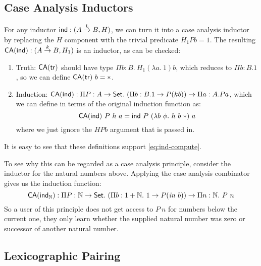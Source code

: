 \documentclass{article}
\newcommand{\Set}{\mathsf{Set}}
\newcommand{\inn}{\mathit{in}}
\begin{document}
\subsection{Case Analysis Inductors}

For any inductor $\mathsf{ind} : (A \stackrel{k}\to B, H)$, we can turn it
into a case analysis inductor by replacing the $H$ component with the
trivial predicate $H_1Pb = 1$. The resulting $\mathsf{CA}(\mathsf{ind}) : (A
\stackrel{k}\to B, H_1)$ is an inductor, as can be checked:
\begin{enumerate}
\item Truth: $\mathsf{CA}(\mathsf{tr})$ should have type $\Pi b : B.\ H_1(\lambda a.\
  1)b$, which reduces to $\Pi b : B. 1$, so we can define $\mathsf{CA}(\mathsf{tr})\ b
  = *$.
\item Induction: $\mathsf{CA}(\ind) : \Pi P : A \to \Set.\ (\Pi b : B. 1 \to P(k
  b)) \to \Pi a : A. P a$, which we can define in terms of the
  original induction function as:
  \begin{displaymath}
    \mathsf{CA}(\ind)\ P\ h\ a = \ind\ P\ (\lambda b\ \phi.\ h\ b\ *)\ a
  \end{displaymath}
  where we just ignore the $H P b$ argument that is passed in.
\end{enumerate}
It is easy to see that these definitions support
\autoref{eq:ind-compute}.

To see why this can be regarded as a case analysis principle, consider
the inductor for the natural numbers above. Applying the case analysis
combinator gives us the induction function:
\begin{displaymath}
  \mathsf{CA}(\ind_{\mathbb{N}}) : \Pi P : \mathbb{N} \to \Set.\ (\Pi b : 1 + \mathbb{N}.\ 1 \to P(\inn\ b)) \to \Pi n : \mathbb{N}.\ P\ n
\end{displaymath}
So a user of this principle does not get access to $P\ n$ for numbers
below the current one, they only learn whether the supplied natural
number was zero or successor of another natural number.

\subsection{Lexicographic Pairing}
\end{document}
